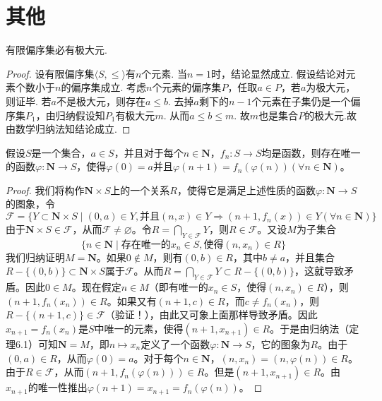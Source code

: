 \documentclass[../../main.tex]{subfiles}%
\begin{document}
\section{其他}

\begin{theorem}[有限偏序集必有极大元]\label{theorem:有限偏序集必有极大元}
有限偏序集必有极大元.
\end{theorem}
\begin{proof}

设有限偏序集$\langle S,\leqslant \rangle$有$n$个元素. 当$n=1$时，结论显然成立.
假设结论对元素个数小于$n$的偏序集成立. 考虑$n$个元素的偏序集$P$，任取$a\in P$，若$a$为极大元，则证毕.
若$a$不是极大元，则存在$a\leqslant b$. 去掉$a$剩下的$n-1$个元素在子集仍是一个偏序集$P_1$，由归纳假设知$P_1$有极大元$m$. 从而$a\leqslant b\leqslant m$. 故$m$也是集合$P$的极大元.故由数学归纳法知结论成立.

\end{proof}

\begin{theorem}[逆归定理]\label{theorem:逆归定理}
假设$S$是一个集合，$a \in S$，并且对于每个$n \in \boldsymbol{N}$，$f_n: S \to S$均是函数，则存在唯一的函数$\varphi: \boldsymbol{N} \to S$，使得$\varphi(0) = a$并且$\varphi(n + 1) = f_n(\varphi(n)) (\forall n \in \boldsymbol{N})$。
\end{theorem}
\begin{proof}

我们将构作$\boldsymbol{N} \times S$上的一个关系$R$，使得它是满足上述性质的函数$\varphi: \boldsymbol{N} \to S$的图象，令
\[
\mathcal{F} = \{ Y \subset \boldsymbol{N} \times S \mid (0, a) \in Y, \text{并且} (n, x) \in Y \Rightarrow (n + 1, f_n(x)) \in Y (\forall n \in \boldsymbol{N}) \}
\]
由于$\boldsymbol{N} \times S \in \mathcal{F}$，从而$\mathcal{F} \neq \varnothing$。令$R = \bigcap_{Y \in \mathcal{F}} Y$，则$R \in \mathcal{F}$。又设$M$为子集合
\[
\{ n \in \boldsymbol{N} \mid \text{存在唯一的} x_n \in S, \text{使得} (n, x_n) \in R \}
\]
我们归纳证明$M = \boldsymbol{N}$。如果$0 \notin M$，则有$(0, b) \in R$，其中$b \neq a$，并且集合$R - \{ (0, b) \} \subset \boldsymbol{N} \times S$属于$\mathcal{F}$。从而$R = \bigcap_{Y \in \mathcal{F}} Y \subset R - \{ (0, b) \}$，这就导致矛盾。因此$0 \in M$。现在假定$n \in M$（即有唯一的$x_n \in S$，使得$(n, x_n) \in R$），则$(n + 1, f_n(x_n)) \in R$。如果又有$(n + 1, c) \in R$，而$c \neq f_n(x_n)$，则$R - \{ (n + 1, c) \} \in \mathcal{F}$（验证！），由此又可象上面那样导致矛盾。因此$x_{n + 1} = f_n(x_n)$是$S$中唯一的元素，使得$(n + 1, x_{n + 1}) \in R$。于是由归纳法（定理6.1）可知$\boldsymbol{N} = M$，即$n \longmapsto x_n$定义了一个函数$\varphi: \boldsymbol{N} \to S$，它的图象为$R$。由于$(0, a) \in R$，从而$\varphi(0) = a$。对于每个$n \in \boldsymbol{N}$，$(n, x_n) = (n, \varphi(n)) \in R$。由于$R \in \mathcal{F}$，从而$(n + 1, f_n(\varphi(n))) \in R$。但是$(n + 1, x_{n + 1}) \in R$。由$x_{n + 1}$的唯一性推出$\varphi(n + 1) = x_{n + 1} = f_n(\varphi(n))$。

\end{proof}
\end{document}
